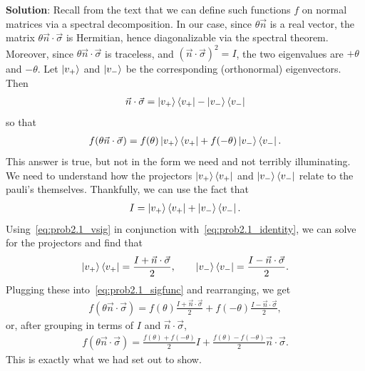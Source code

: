\documentclass{book}
\begin{document}
    \textbf{Solution}: Recall from the text that we can define such functions $f$ on normal matrices via a spectral decomposition. In our case, since $\theta \vec{n}$ is a real vector, the matrix $\theta \vec{n} \cdot \vec{\sigma}$ is Hermitian, hence diagonalizable via the spectral theorem. Moreover, since $\theta \vec{n} \cdot \vec{\sigma}$ is traceless, and $(\vec{n} \cdot \vec{\sigma})^2 = I$, the two eigenvalues are $+\theta$ and $-\theta$. Let $\ket{v_+}$ and $\ket{v_-}$ be the corresponding (orthonormal) eigenvectors. Then
    \begin{align} \label{eq:prob2.1_vsig}
        \vec{n} \cdot \vec{\sigma} = \ket{v_+}\bra{v_+} - \ket{v_-}\bra{v_-}
    \end{align}
    so that
    \begin{align} \label{eq:prob2.1_sigfunc}
        f(\theta \vec{n} \cdot \vec{\sigma}) = f(\theta) \ket{v_+}\bra{v_+} + f(-\theta) \ket{v_-}\bra{v_-}.
    \end{align}
    This answer is true, but not in the form we need and not terribly illuminating. We need to understand how the projectors $\ket{v_+}\bra{v_+}$ and $\ket{v_-}\bra{v_-}$ relate to the pauli's themselves. Thankfully, we can use the fact that
    \begin{align} \label{eq:prob2.1_identity}
        I = \ket{v_+}\bra{v_+} + \ket{v_-}\bra{v_-}.
    \end{align}
    Using~\eqref{eq:prob2.1_vsig} in conjunction with~\eqref{eq:prob2.1_identity}, we can solve for the projectors and find that
    \begin{align}
        \ket{v_+}\bra{v_+} = \frac{I + \vec{n} \cdot \vec{\sigma}}{2}, \qquad \ket{v_-}\bra{v_-} = \frac{I - \vec{n} \cdot \vec{\sigma}}{2}.
    \end{align}
    Plugging these into~\eqref{eq:prob2.1_sigfunc} and rearranging, we get
    \begin{align}
        f(\theta \vec{n} \cdot \vec{\sigma}) = f(\theta) \frac{I + \vec{n} \cdot \vec{\sigma}}{2} + f(-\theta) \frac{I - \vec{n} \cdot \vec{\sigma}}{2},
    \end{align}
    or, after grouping in terms of $I$ and $\vec{n} \cdot \vec{\sigma}$,
    \begin{align}
        f(\theta \vec{n} \cdot \vec{\sigma}) = \frac{f(\theta) + f(-\theta)}{2} I + \frac{f(\theta)- f(-\theta)}{2} \vec{n} \cdot \vec{\sigma}.
    \end{align}
    This is exactly what we had set out to show.
\end{document}
